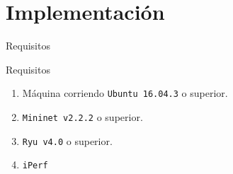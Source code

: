 \documentclass[10pt,spanish,xcolor={svgnames}]{beamer}
\begin{document}

\section{Implementación}

\begin{frame}{Requisitos}
\vspace*{-2em}
\begin{exampleblock}{\LARGE Requisitos}
\begin{center}
\begin{enumerate}
\large
\item Máquina corriendo \texttt{Ubuntu 16.04.3} o superior.
\vspace*{0.5em}
\item \texttt{Mininet v2.2.2} o superior.
\vspace*{0.5em}
\item \texttt{Ryu v4.0} o superior. 
\vspace*{0.5em}
\item \texttt{iPerf} \end{enumerate}
\end{center}
\end{exampleblock}
\end{frame}
\end{document}
